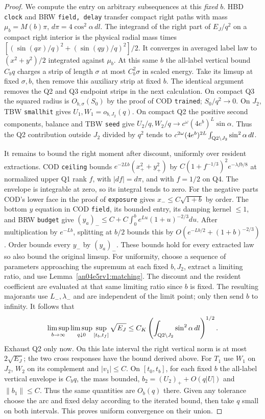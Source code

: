 \documentclass[11pt]{article}
\newcommand{\dd}{\,dl}
\begin{document}
\begin{proof}
We compute the entry on arbitrary subsequences at this \emph{fixed} $b$. HBD \texttt{clock} and BRW \texttt{field, delay} transfer compact right paths with mass $\mu_b=M(b)\pi$, $d\pi=4\cos^2\alpha\,dl$. The integrand of the right part of $E_J/q^2$ on a compact right interior is the physical radial mass times
$[(\sin(qx)/q)^2+(\sin(qy)/q)^2]/2$. It converges in averaged label law to $(x^2+y^2)/2$ integrated against $\mu_b$. At this same $b$ the all-label vertical bound $C_b q$ charges a strip of length $\sigma$ at most $C_b^2\sigma$ in scaled energy. Take its limsup at fixed $\sigma,b$, then remove this auxiliary strip at fixed $b$. The identical argument removes the Q2 and Q3 endpoint strips in the next calculation. On compact Q3 the squared radius is $O_{b,\sigma}(S_0)$ by the proof of COD \texttt{trained}; $S_0/q^2\to0$. On $J_2$, TBW \texttt{smallhit} gives $U_1,W_1=o_{b,J_2}(q)$. On compact Q2 the positive second components, balance and TBW \texttt{seed} give
$U_2/q,W_2/q\to c^\omega(4e^b)^L\sin\alpha$. Thus the Q2 contribution outside $J_2$ divided by $q^2$ tends to $c^{2\omega}(4e^b)^{2L}\int_{{\rm Q2}\setminus J_2}\sin^2\alpha\dd$.

It remains to bound the right moment after discount, uniformly over resident extractions. COD \texttt{ceiling} bounds $e^{-2Lb}(x_+^2+y_+^2)$ by $C(1+f^{-1/3})^2 e^{-\lambda fb/8}$ at normalized upper Q1 rank $f$, with $|df|=d\pi$, and with $f=1/2$ on Q4. The envelope is integrable at zero, so its integral tends to zero. For the negative parts COD's lower face in the proof of \texttt{exposure} gives $x_-\le C\sqrt{1+b}$ by order. The bottom $y$ equation in COD \texttt{field}, its bounded entry, its damping kernel $\le1$, and BRW \texttt{budget} give $(y_a)_-\le C+C\int_0^b e^{Lu}(1+u)^{-2/3}du$. After multiplication by $e^{-Lb}$, splitting at $b/2$ bounds this by $O(e^{-Lb/2}+(1+b)^{-2/3})$. Order bounds every $y_-$ by $(y_a)_-$. These bounds hold for every extracted law so also bound the original limsup. For uniformity, choose a sequence of parameters approaching the supremum at each fixed $b,J_2$, extract a limiting ratio, and use Lemma~\ref{an04e5rv1:matching}. The discount and the resident coefficient are evaluated at that same limiting ratio since $b$ is fixed. The resulting majorants use $L_-,\lambda_-$ and are independent of the limit point; only then send $b$ to infinity. It follows that
\[
 \limsup_{b\to\infty}\limsup_{q\downarrow0}
 \sup_{[t_b,t_f]}\sqrt{E_J}
 \le C_K\left(\int_{{\rm Q2}\setminus J_2}\sin^2\alpha\dd\right)^{1/2}.
\]
Exhaust Q2 only now. On this late interval the right vertical norm is at most $2\sqrt{E_J}$; the two cross responses have the bound derived above. For $T_1$ use $W_1$ on $J_2$, $W_2$ on its complement and $|v_1|\le C$. On $[t_0,t_b]$, for each fixed $b$ the all-label vertical envelope is $C_bq$, the mass bounded, $b_2=(U_2)_++O(q|U|)$ and $\|b_1\|\le C$. Thus the same quantities are $O_b(q)$ there. Given any tolerance choose the arc and fixed delay according to the iterated bound, then take $q$ small on both intervals. This proves uniform convergence on their union.
\end{proof}
\end{document}
